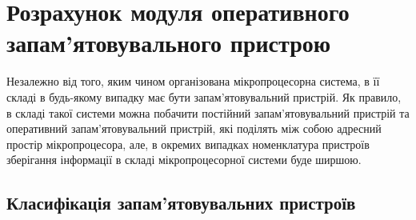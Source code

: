 \chapter{Розрахунок модуля оперативного запам'ятовувального пристрою}



Незалежно від того, яким чином організована мікропроцесорна система, в її складі в будь-якому випадку має бути запам'ятовувальний пристрій. Як правило, в складі такої системи можна побачити постійний запам'я\-то\-ву\-валь\-ний пристрій та оперативний запам'ятовувальний пристрій, які поділять між собою адресний простір мікропроцесора, але, в окремих випадках номенклатура пристроїв зберігання інформації в складі мікропроцесорної системи буде ширшою.


\section{Класифікація запам'ятовувальних пристроїв}

